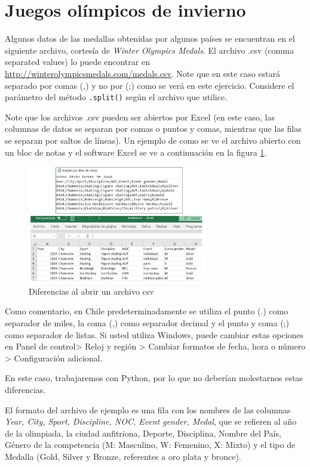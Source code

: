 \section{Juegos olímpicos de invierno}

Algunos datos de las medallas obtenidas por algunos países se encuentran en el siguiente archivo, cortesía de \textit{Winter Olympics Medals}. El archivo .csv (comma separated values) lo puede encontrar en \url{http://winterolympicsmedals.com/medals.csv}. Note que en este caso estará separado por comas (,) y no por (;) como se verá en este ejercicio. Considere el parámetro del método \texttt{.split()} según el archivo que utilice.

Note que los archivos .csv pueden ser abiertos por Excel (en este caso, las columnas de datos se separan por comas o puntos y comas, mientras que las filas se separan por saltos de líneas). Un ejemplo de como se ve el archivo abierto con un bloc de notas y el software Excel se ve a continuación en la figura \ref{fig:csv}.

\begin{figure}[H]
    \centering
    \includegraphics[width=0.7\textwidth]{Guia/csv.png}
    \caption{Diferencias al abrir un archivo csv}
    \label{fig:csv}
\end{figure}

Como comentario, en Chile predeterminadamente se utiliza el punto (.) como separador de miles, la coma (,) como separador decimal y el punto y coma (;) como separador de listas. Si usted utiliza Windows, puede cambiar estas opciones en Panel de control> Reloj y región > Cambiar formatos de fecha, hora o número > Configuración adicional.

En este caso, trabajaremos con Python, por lo que no deberían molestarnos estas diferencias.

El formato del archivo de ejemplo es una fila con los nombres de las columnas \textit{Year, City, Sport, Discipline, NOC, Event gender, Medal}, que se refieren al año de la olimpiada, la ciudad anfitriona, Deporte, Disciplina, Nombre del País, Género de la competencia (M: Masculino, W: Femenino, X: Mixto) y el tipo de Medalla (Gold, Silver y Bronze, referentes a oro plata y bronce).

